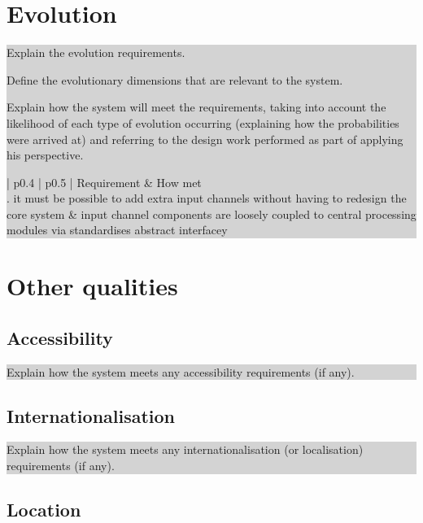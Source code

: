 \documentclass[a4paper,11pt]{report}
\newcommand{\instructions}[1]{
  \noindent\colorbox{lightgray}{%
    \parbox{\linewidth}{%
      #1
    }%
  }%
 \vspace{0.1cm}
}
\begin{document}
\section{Evolution}
\label{sec:evolution}

\instructions{
Explain the evolution requirements.

Define the evolutionary dimensions that are relevant to the system.

Explain  how the system will meet the requirements, taking into
account the likelihood of each type of evolution occurring (explaining
how the probabilities were arrived at) and referring to the design
work performed as part of applying his perspective.

\begin{center}
  \begin{tabular}[h!]{| p{0.4\textwidth} | p{0.5\textwidth} |}
    \hline
    \rowcolor{gray}
    Requirement & How met \\
    \hline
    \hline
    1. it must be possible to add extra input channels without having
    to redesign the core system & input channel components are loosely
    coupled to central processing modules via standardises abstract
    interfacey\\

    \hline
 \end{tabular}
\end{center}
}

\section{Other qualities}
\label{sec:other-qualities}

\subsection{Accessibility}
\label{sec:accessibility}

\instructions{
Explain how the system meets any accessibility requirements (if any).
}

\subsection{Internationalisation}
\label{sec:internationalisation}

\instructions{
Explain how the system meets any internationalisation (or
localisation) requirements (if any).
}

\subsection{Location}
\label{sec:location}
\end{document}
